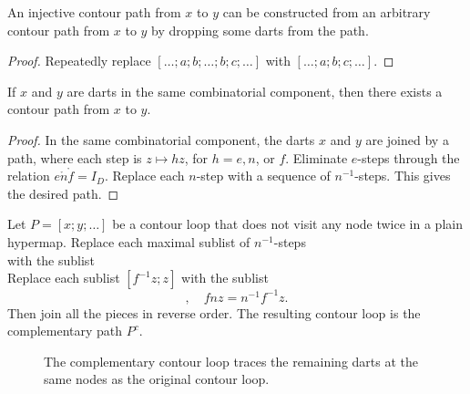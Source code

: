 \begin{lemma} An injective contour path from
$x$ to $y$ can be constructed from an arbitrary contour path from
$x$ to $y$ by dropping some darts from the path.
\end{lemma}

\begin{proof} Repeatedly replace $[\ldots;a;b;\ldots;b;c;\ldots]$ with
$[\ldots;a;b;c;\ldots]$.
\end{proof}





\begin{lemma}  
If $x$ and $y$ are darts in the same combinatorial component, then
there exists a contour path from $x$ to $y$.
\end{lemma}

\begin{proof} 
In the same combinatorial component, the darts $x$ and $y$ are
joined by a path, where each step is $z\mapsto h z$, for $h=e,n$, or
$f$.  Eliminate $e$-steps through the relation $e\ocirc n\ocirc f =
I_D$.  Replace each $n$-step with a sequence of $n^{-1}$-steps.  This
gives the desired path.
\end{proof}
%

\begin{definition} 
Let $P=[x;y;\ldots]$ be a contour loop that does not visit any node
twice in a plain hypermap.  Replace each maximal sublist of
$n^{-1}$-steps
\begin{displaymath}
[z;n^{-1} z; \ldots; n^{-k} z]
\end{displaymath}
with the sublist
\begin{displaymath}
[n^{-(k+1)} z;n^{-(k+2)} z;\ldots; n z]
\end{displaymath}
Replace each sublist $[f^{-1} z;z]$ with the sublist
\begin{displaymath}
[n z; f n z],\quad f n z = n^{-1} f^{-1} z.
\end{displaymath}
Then join all the pieces in reverse order. The resulting contour loop
is the complementary path $P^c$.  %
\end{definition}

\begin{figure}[htb]
\centering
{}
\caption{The complementary contour loop traces the remaining darts
at the same nodes as the original contour loop. }
\label{fig:contour-comp}
\end{figure}
%

